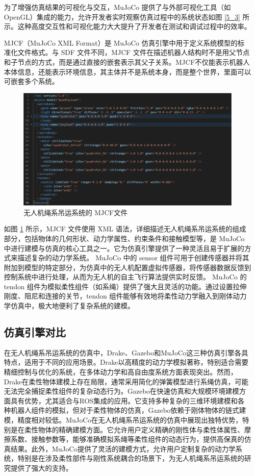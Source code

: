 \documentclass[lang=chs, degree=master, blindreview=false, winfonts=true]{yanputhesis}
\begin{document}
为了增强仿真结果的可视化与交互，MuJoCo 提供了与外部可视化工具（如 OpenGL）集成的能力，允许开发者实时观察仿真过程中的系统状态如图 \ref{5_3} 所示。这种高度交互性和可视化能力大大提升了开发者在测试和调试过程中的效率。

MJCF（MuJoCo XML Format）是 MuJoCo 仿真引擎中用于定义系统模型的标准化文件格式。与 SDF 文件不同，MJCF 文件在描述机器人结构时不是用父节点和子节点的方式，而是通过直接的嵌套表示其父子关系。MJCF不仅能表示机器人本体信息，还能表示环境信息，其主体并不是系统本身，而是整个世界，里面可以可嵌套多个系统。

\begin{figure}[hbt!]
	\centering
	\includegraphics[width=36pc]{picture/MJCF.png} 
	\caption{无人机绳系吊运系统的 MJCF文件} 
	\label{MJCF}
\end{figure}
如图 \ref{MJCF} 所示，MJCF 文件使用 XML 语法，详细描述无人机绳系吊运系统的组成部分，包括物体的几何形状、动力学属性、约束条件和接触模型等，是 MuJoCo 中进行建模与仿真的核心工具之一。它为仿真引擎提供了一种灵活且易于扩展的方式来描述复杂的动力学系统。
MuJoCo 中的 sensor 组件可用于创建传感器并将其附加到模型的特定部分，为仿真中的无人机配置虚拟传感器，将传感器数据反馈到控制系统中进行处理，从而为无人机的自主飞行算法提供实时反馈。
MuJoCo 的 tendon 组件为模拟柔性组件（如系绳）提供了强大且灵活的功能。通过设置拉伸刚度、阻尼和连接的关节，tendon 组件能够有效地将柔性动力学融入到刚体动力学仿真中，极大地便利了复杂系统的建模。


\subsection{仿真引擎对比}
在无人机绳系吊运系统的仿真中，Drake、Gazebo和MuJoCo这三种仿真引擎各具特点，适用于不同的应用场景。Drake以高精度的动力学模拟著称，特别适合需要精细控制与优化的系统，在多体动力学和高自由度系统方面表现突出。然而，Drake在柔性物体建模上存在局限，通常采用简化的弹簧模型进行系绳仿真，可能无法完全捕捉柔性组件的复杂动态行为。Gazebo在快速仿真和大规模环境建模方面具有优势，尤其适合与ROS集成的应用。它支持多种复杂的三维环境建模和各种机器人组件的模拟，但对于柔性物体的仿真，Gazebo依赖于刚体物体的链式建模，精度相对较低。MuJoCo在无人机绳系吊运系统的仿真中展现出独特优势，特别是在柔性物体的精确建模方面。它允许用户定义精确的刚性体与柔性体属性、摩擦系数、接触参数等，能够准确模拟系绳等柔性组件的动态行为，提供高保真的仿真结果。此外，MuJoCo提供了灵活的建模方式，允许用户定制复杂的动力学系统，特别是在涉及柔性部件与刚性系统耦合的场景下，为无人机绳系吊运系统的研究提供了强大的支持。
\end{document}
